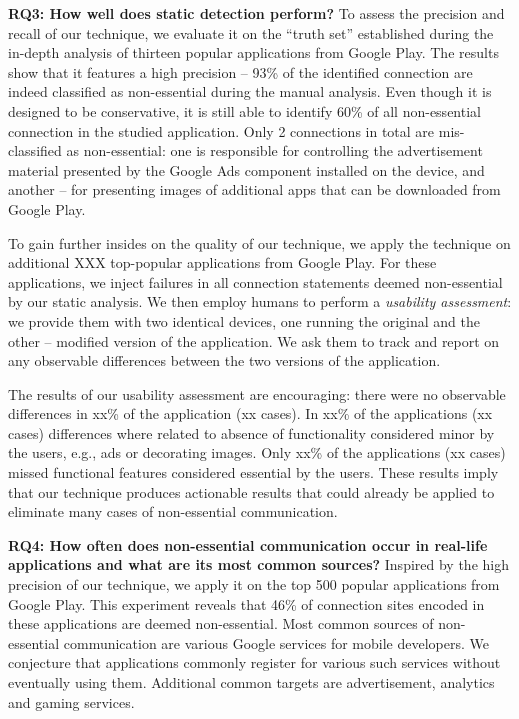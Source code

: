 \noindent 
{\bf RQ3: How well does static detection perform?}
To assess the precision and recall of our technique, we evaluate it on the ``truth set'' established during the in-depth analysis of thirteen popular applications from Google Play.
The results show that it features a high precision -- 93\% of the identified connection are indeed classified as non-essential during the manual analysis. Even though it is designed to be conservative, it is still able to identify  60\% of all non-essential connection in the studied application.
Only 2 connections in total are mis-classified as non-essential: one is responsible for controlling the advertisement material presented by the Google Ads component installed on the device, and another -- for presenting images of additional apps that can be downloaded from Google Play. 

To gain further insides on the quality of our technique, we apply the technique on additional XXX top-popular applications from Google Play. For these applications, we inject failures in all connection statements deemed non-essential by our static analysis. We then employ humans to perform a \emph{usability assessment}: we provide them with two identical devices, one running the original and the other -- modified version of the application. We ask them to track and report on any observable differences between the two versions of the application. 

The results of our usability assessment are encouraging: there were no observable differences in xx\% of the application (xx cases). In xx\% of the applications (xx cases) differences where related to absence of functionality considered minor by the users, e.g., ads or decorating images. Only xx\% of the applications (xx cases) missed functional features considered essential by the users. 
These results imply that our technique produces actionable results that could already be applied to eliminate many cases of non-essential communication. 


\noindent 
{\bf RQ4: How often does non-essential communication occur in real-life applications and what are its most common sources?}
Inspired by the high precision of our technique, we apply it on the top 500 popular applications from Google Play. This experiment reveals that 46\% of connection sites encoded in these applications 
are deemed non-essential.
Most common sources of non-essential communication are various Google services for mobile developers. We conjecture 
that applications commonly register for various such services without eventually using them. 
Additional common targets are advertisement, analytics and gaming services. 


